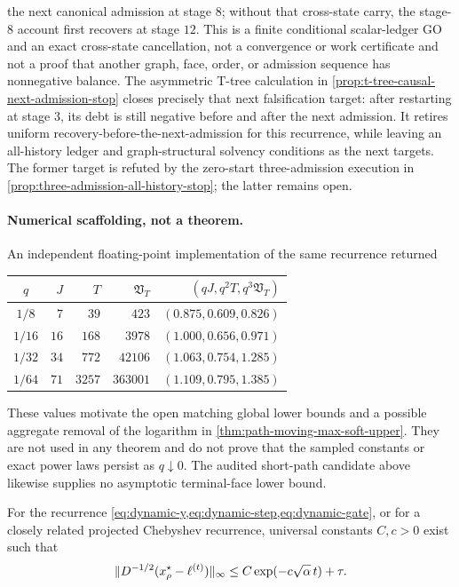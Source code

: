 the next canonical admission at stage $8$; without that cross-state carry, the
stage-$8$ account first recovers at stage $12$.  This is a finite conditional
scalar-ledger GO and an exact cross-state cancellation, not a convergence or
work certificate and not a proof that another graph,
face, order, or admission sequence has nonnegative balance.  The asymmetric
T-tree calculation in
\cref{prop:t-tree-causal-next-admission-stop} closes precisely that next
falsification target: after restarting at stage $3$, its debt is still
negative before and after the next admission.  It retires uniform
recovery-before-the-next-admission for this recurrence, while leaving an
all-history ledger and graph-structural solvency conditions as the next
targets.  The former target is refuted by the zero-start three-admission
execution in \cref{prop:three-admission-all-history-stop}; the latter remains
open.

\paragraph{Numerical scaffolding, not a theorem.}
An independent floating-point implementation of the same recurrence returned
\begin{center}
\begin{tabular}{@{}c|rrrr@{}}
$q$ & $J$ & $T$ & $\mathfrak V_T$ &
$(qJ,q^2T,q^3\mathfrak V_T)$\\
\midrule
$1/8$  & $7$  & $39$   & $423$    & $(0.875,0.609,0.826)$\\
$1/16$ & $16$ & $168$  & $3978$   & $(1.000,0.656,0.971)$\\
$1/32$ & $34$ & $772$  & $42106$  & $(1.063,0.754,1.285)$\\
$1/64$ & $71$ & $3257$ & $363001$ & $(1.109,0.795,1.385)$
\end{tabular}
\end{center}
These values motivate the open matching global lower bounds and a possible
aggregate removal of the logarithm in
\cref{thm:path-moving-max-soft-upper}.  They are not used in any theorem and
do not prove that the sampled constants or exact power laws persist as
$q\downarrow0$.  The audited short-path candidate above likewise supplies no
asymptotic terminal-face lower bound.

\begin{conjecture}
\label{conj:one-sided-continuation}
For the recurrence \cref{eq:dynamic-y,eq:dynamic-step,eq:dynamic-gate}, or for
a closely related projected Chebyshev recurrence, universal constants $C,c>0$
exist such that
\begin{equation}
 \lVert D^{-1/2}(x_\rho^\star-\ell^{(t)})\rVert_\infty
 \leq C\exp(-c\sqrt\alpha\,t)+\tau.
 \label{eq:desired-continuation}
\end{equation}
\end{conjecture}

